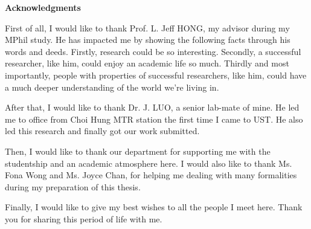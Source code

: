 \centerline{{\bf \Large Acknowledgments}} \vspace{5mm} \noindent

First of all, I would like to thank Prof. L. Jeff HONG, my advisor during my MPhil study. He has impacted me by showing the following facts through his words and deeds. Firstly, research could be so interesting. Secondly, a successful researcher, like him, could enjoy an academic life so much. Thirdly and most importantly, people with properties of successful researchers, like him, could have a much deeper understanding of the world we're living in.

After that, I would like to thank Dr. J. LUO, a senior lab-mate of mine. He led me to office from Choi Hung MTR station the first time I came to UST. He also led this research and finally got our work submitted.

Then, I would like to thank our department for supporting me with the studentship and an academic atmosphere here. I would also like to thank Ms. Fona Wong and Ms. Joyce Chan, for helping me dealing with many formalities during my preparation of this thesis.

Finally, I would like to give my best wishes to all the people I meet here. Thank you for sharing this period of life with me.
